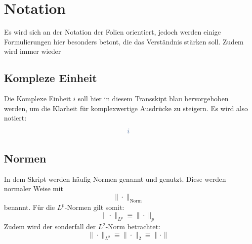\section*{Notation}
Es wird sich an der Notation der Folien orientiert, jedoch werden einige Formulierungen hier besonders betont, die das Verständnis stärken soll. 
Zudem wird immer wieder

\subsection*{Kompleze Einheit}
Die Komplexe Einheit $i$ soll hier in diesem Transskipt blau hervorgehoben werden, um die Klarheit für komplexwertige Ausdrücke zu steigern. Es wird also notiert:
$$
    \i
$$

\subsection*{Normen}
In dem Skript werden häufig Normen genannt und genutzt. Diese werden normaler Weise mit 
$$
    \| \cdot \|_\text{Norm}
$$
benannt. Für die $L^p$-Normen gilt somit:
$$
    \| \cdot \|_{L^p} \equiv \| \cdot \|_p 
$$
Zudem wird der sonderfall der $L^2$-Norm betrachtet:
$$
    \| \cdot \|_{L^2} \equiv \| \cdot \|_2  \equiv \| \cdot \| 
$$